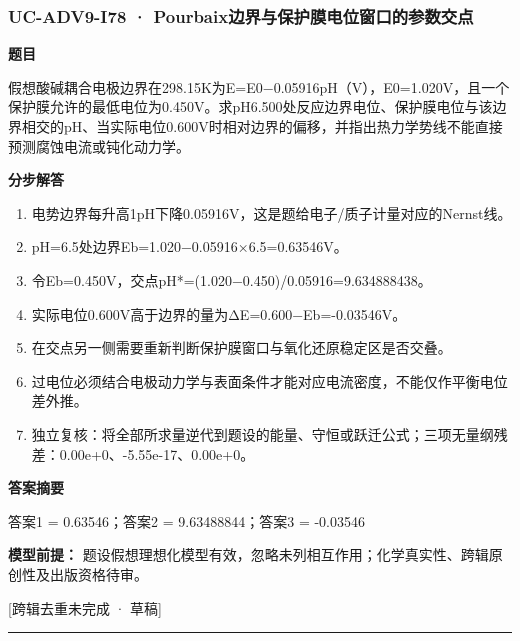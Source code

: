 \documentclass[UTF8,11pt,a4paper]{ctexart}
\begin{document}
\subsubsection*{UC-ADV9-I78 · Pourbaix边界与保护膜电位窗口的参数交点}
\noindent\textbf{题目}\par
假想酸碱耦合电极边界在298.15K为E=E0−0.05916pH（V），E0=1.020V，且一个保护膜允许的最低电位为0.450V。求pH6.500处反应边界电位、保护膜电位与该边界相交的pH、当实际电位0.600V时相对边界的偏移，并指出热力学势线不能直接预测腐蚀电流或钝化动力学。\par
\medskip\noindent\textbf{分步解答}
\begin{enumerate}
\item 电势边界每升高1pH下降0.05916V，这是题给电子/质子计量对应的Nernst线。
\item pH=6.5处边界Eb=1.020−0.05916×6.5=0.63546V。
\item 令Eb=0.450V，交点pH*=(1.020−0.450)/0.05916=9.634888438。
\item 实际电位0.600V高于边界的量为ΔE=0.600−Eb=-0.03546V。
\item 在交点另一侧需要重新判断保护膜窗口与氧化还原稳定区是否交叠。
\item 过电位必须结合电极动力学与表面条件才能对应电流密度，不能仅作平衡电位差外推。
\item 独立复核：将全部所求量逆代到题设的能量、守恒或跃迁公式；三项无量纲残差：0.00e+0、-5.55e-17、0.00e+0。
\end{enumerate}
\noindent\textbf{答案摘要}\par
答案1 = 0.63546；答案2 = 9.63488844；答案3 = -0.03546\par
\noindent\textbf{模型前提：}
题设假想理想化模型有效，忽略未列相互作用；化学真实性、跨辑原创性及出版资格待审。\par
\noindent\textcolor{red!65!black}{[跨辑去重未完成 · 草稿]} \par
\medskip\hrule\medskip
{}
\end{document}
